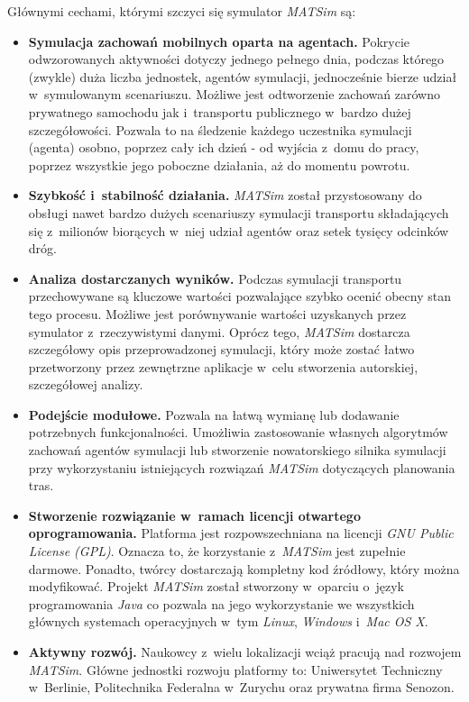 \documentclass[twoside,12pt]{report}
\begin{document}
Głównymi cechami, którymi szczyci się symulator \textit{MATSim} są:
\begin{itemize}
\item \textbf{Symulacja zachowań mobilnych oparta na agentach.} Pokrycie odwzorowanych aktywności dotyczy jednego pełnego dnia, podczas którego (zwykle) duża liczba jednostek, agentów symulacji, jednocześnie bierze udział w~symulowanym scenariuszu. Możliwe jest odtworzenie zachowań zarówno prywatnego samochodu jak i~transportu publicznego w~bardzo dużej szczegółowości. Pozwala to na śledzenie każdego uczestnika symulacji (agenta) osobno, poprzez cały ich dzień - od wyjścia z~domu do pracy, poprzez wszystkie jego poboczne działania, aż do momentu powrotu.

\item \textbf{Szybkość i~stabilność działania.} \textit{MATSim} został przystosowany do obsługi nawet bardzo dużych scenariuszy symulacji transportu składających się z~milionów biorących w~niej udział agentów oraz setek tysięcy odcinków dróg.

\item \textbf{Analiza dostarczanych wyników.} Podczas symulacji transportu przechowywane są kluczowe wartości pozwalające szybko ocenić obecny stan tego procesu. Możliwe jest porównywanie wartości uzyskanych przez symulator z~rzeczywistymi danymi. Oprócz tego, \textit{MATSim} dostarcza szczegółowy opis przeprowadzonej symulacji, który może zostać łatwo przetworzony przez zewnętrzne aplikacje w~celu stworzenia autorskiej, szczegółowej analizy.

\item \textbf{Podejście modułowe.} Pozwala na łatwą wymianę lub dodawanie potrzebnych funkcjonalności. Umożliwia zastosowanie własnych algorytmów zachowań agentów symulacji lub stworzenie nowatorskiego silnika symulacji przy wykorzystaniu istniejących rozwiązań \textit{MATSim} dotyczących planowania tras.

\item \textbf{Stworzenie rozwiązanie w~ramach licencji otwartego oprogramowania.} Platforma jest rozpowszechniana na licencji \textit{GNU Public License (GPL)}. Oznacza to, że korzystanie z~\textit{MATSim} jest zupełnie darmowe. Ponadto, twórcy dostarczają kompletny kod źródłowy, który można modyfikować. Projekt \textit{MATSim} został stworzony w~oparciu o~język programowania \textit{Java} co pozwala na jego wykorzystanie we wszystkich głównych systemach operacyjnych w~tym \textit{Linux}, \textit{Windows} i~\textit{Mac OS X}.

\item \textbf{Aktywny rozwój.} Naukowcy z~wielu lokalizacji wciąż pracują nad rozwojem \textit{MATSim}. Główne jednostki rozwoju platformy to: Uniwersytet Techniczny w~Berlinie, Politechnika Federalna w~Zurychu oraz prywatna firma Senozon. 
\end{itemize}
\end{document}
